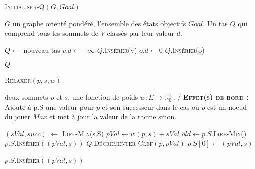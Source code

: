 

\begin{algorithm}
	\caption{\textsc {Initialiser-Q}$(G,Goal)$}
	 \label{algo:initQ}
	\begin{algorithmic}[1]
		\REQUIRE $G$ un graphe orienté pondéré, l'ensemble des états objectifs $Goal$.
		\ENSURE Un tas $Q$ qui comprend tous les sommets de $V$ classés par leur valeur $d$.
		
		\STATE $Q \leftarrow$ nouveau tas 
			\STATE $v.d \leftarrow +\infty$
			\STATE $Q.$\textsc{Insérer}(v)
		\ENDFOR
			\STATE $o.d \leftarrow 0$
			\STATE $Q.$\textsc{Insérer}(o)	
		\ENDFOR
		
		\RETURN $Q$
	
			
\end{algorithmic}
		
\end{algorithm}


\begin{algorithm}
	\caption{\textsc {Relaxer}$(p,s,w)$}
	 \label{algo:relaxerMinMax}
	\begin{algorithmic}[1]
		\REQUIRE deux sommets $p$ et $s$, une fonction de poids $w : E \rightarrow \mathbb{R}^{+}_{0}$.
		\ENSURE / \textbf{\textsc{Effet(s) de bord :}} Ajoute à p.S une valeur pour $p$ et son successeur dans le cas où
		$p$ est un noeud du jouer $\textit{Max}$ et met à jour la valeur de la racine sinon.
		
		\STATE $(sVal,succ)$ $\leftarrow$ \textsc{Lire-Min}(s.S) \label{lalgo:relaxer1}
		\STATE $pVal \leftarrow w(p,s) + sVal$	
		\STATE $old \leftarrow p.S.$\textsc{Lire-Min()} 
		\STATE $p.S.$\textsc{Insérer}$((pVal,s))$ \label{lalgo:relaxer4}
		 \label{lalgo:relaxer5}
			\STATE $Q.$\textsc{Décrémenter-Clef}$(p,pVal)$ 
				\STATE $p.S[0] \leftarrow (pVal,s)$
			\ENDIF 
		\ENDIF \label{lalgo:relaxer10}
		
		 \label{lalgo:relaxer11}
			\STATE $p.S.$\textsc{Insérer}$((pVal,s))$ 
		\ENDIF \label{lalgo:relaxer12}
			
\end{algorithmic}
		
\end{algorithm}


